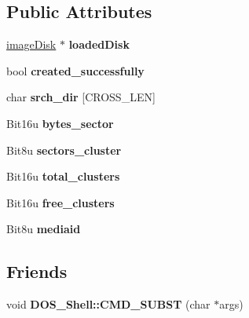 \subsection*{Public Attributes}
\begin{DoxyCompactItemize}
\item 
\hypertarget{classfatDrive_a3a263d1b8a02f7aff910fe9ab2347b4f}{\hyperlink{classimageDisk}{image\-Disk} $\ast$ {\bfseries loaded\-Disk}}\label{classfatDrive_a3a263d1b8a02f7aff910fe9ab2347b4f}

\item 
\hypertarget{classfatDrive_ae3927936196f98009856fc9f46f1065a}{bool {\bfseries created\-\_\-successfully}}\label{classfatDrive_ae3927936196f98009856fc9f46f1065a}

\item 
\hypertarget{classfatDrive_a87c406b52e2ede2b0d6d19df26e66184}{char {\bfseries srch\-\_\-dir} \mbox{[}C\-R\-O\-S\-S\-\_\-\-L\-E\-N\mbox{]}}\label{classfatDrive_a87c406b52e2ede2b0d6d19df26e66184}

\item 
\hypertarget{classfatDrive_a342b82338d182099e1de415a2296ee53}{Bit16u {\bfseries bytes\-\_\-sector}}\label{classfatDrive_a342b82338d182099e1de415a2296ee53}

\item 
\hypertarget{classfatDrive_aaba7c7638ee28c29d91ef7cf656f4e5c}{Bit8u {\bfseries sectors\-\_\-cluster}}\label{classfatDrive_aaba7c7638ee28c29d91ef7cf656f4e5c}

\item 
\hypertarget{classfatDrive_a85eca1f2d4a5e13fc25435b01eea3b64}{Bit16u {\bfseries total\-\_\-clusters}}\label{classfatDrive_a85eca1f2d4a5e13fc25435b01eea3b64}

\item 
\hypertarget{classfatDrive_a3da9f308f747d9e0682c032474594de9}{Bit16u {\bfseries free\-\_\-clusters}}\label{classfatDrive_a3da9f308f747d9e0682c032474594de9}

\item 
\hypertarget{classfatDrive_a44fa7ae4eff20a4f7391c131ef713746}{Bit8u {\bfseries mediaid}}\label{classfatDrive_a44fa7ae4eff20a4f7391c131ef713746}

\end{DoxyCompactItemize}
\subsection*{Friends}
\begin{DoxyCompactItemize}
\item 
\hypertarget{classfatDrive_a0d22a35db1d3ebd10c7ef057a1f89fec}{void {\bfseries D\-O\-S\-\_\-\-Shell\-::\-C\-M\-D\-\_\-\-S\-U\-B\-S\-T} (char $\ast$args)}\label{classfatDrive_a0d22a35db1d3ebd10c7ef057a1f89fec}

\end{DoxyCompactItemize}



